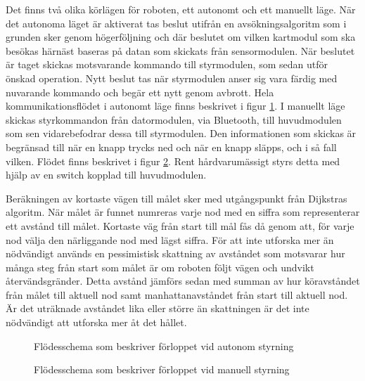 \documentclass[11pt]{article}
\begin{document}
\begin{flushleft}
Det finns två olika körlägen för roboten, ett autonomt och ett manuellt läge. När det autonoma läget är aktiverat tas beslut utifrån en avsökningsalgoritm som i grunden sker genom högerföljning och där beslutet om vilken kartmodul som ska besökas härnäst baseras på datan som skickats från sensormodulen. När beslutet är taget skickas motsvarande kommando till styrmodulen, som sedan utför önskad operation. Nytt beslut tas när styrmodulen anser sig vara färdig med nuvarande kommando och begär ett nytt genom avbrott. Hela kommunikationsflödet i autonomt läge finns beskrivet i figur \ref{autonomousMode}. I manuellt läge skickas styrkommandon från datormodulen, via Bluetooth\textsuperscript{\circledR}, till huvudmodulen som sen vidarebefodrar dessa till styrmodulen. Den informationen som skickas är begränsad till när en knapp trycks ned och när en knapp släpps, och i så fall vilken. Flödet finns beskrivet i figur \ref{manualMode}. Rent hårdvarumässigt styrs detta med hjälp av en switch kopplad till huvudmodulen.

Beräkningen av kortaste vägen till målet sker med utgångspunkt från Dijkstras algoritm. När målet är funnet numreras varje nod med en siffra som representerar ett avstånd till målet. Kortaste väg från start till mål fås då genom att, för varje nod välja den närliggande nod med lägst siffra. För att inte utforska mer än nödvändigt används en pessimistisk skattning av avståndet som motsvarar hur många steg från start som målet är om roboten följt vägen och undvikt återvändsgränder. Detta avstånd jämförs sedan med summan av hur köravståndet från målet till aktuell nod samt manhattanavståndet från start till aktuell nod. Är det uträknade avståndet lika eller större än skattningen är det inte nödvändigt att utforska mer åt det hållet.

\begin{figure}[htbp]
\centering
\noindent\resizebox{0.9\linewidth}{!}{
	}
	\cprotect\caption{Flödesschema som beskriver förloppet vid autonom styrning \label{autonomousMode}}	
\end{figure}

\begin{figure}[htbp]
\centering
\noindent\resizebox{0.9\linewidth}{!}{
	}
	\cprotect\caption{Flödesschema som beskriver förloppet vid manuell styrning \label{manualMode}}	
\end{figure}

\pagebreak


\end{flushleft}
\end{document}
